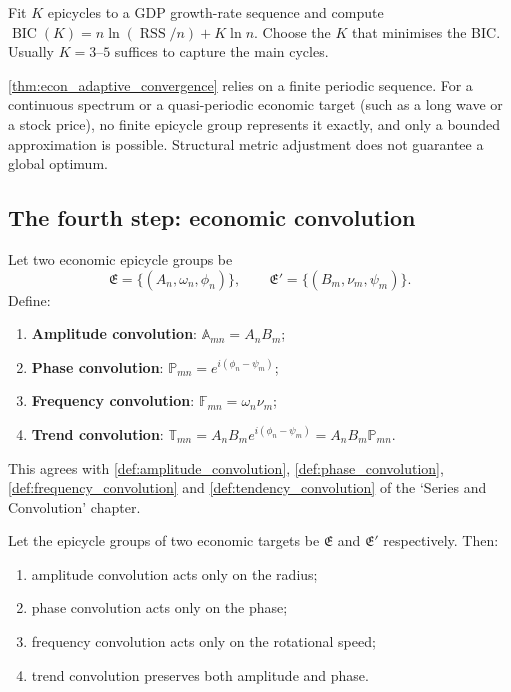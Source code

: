 \begin{example}\label{ex:econ_bic}
Fit $K$ epicycles to a GDP growth-rate sequence and compute $\operatorname{BIC}(K)=n\ln(\operatorname{RSS}/n)+K\ln n$. Choose the $K$ that minimises the BIC. Usually $K=3$--$5$ suffices to capture the main cycles.
\end{example}

\begin{remark}\label{rem:econ_adaptive_boundary}
\cref{thm:econ_adaptive_convergence} relies on a finite periodic sequence. For a continuous spectrum or a quasi-periodic economic target (such as a long wave or a stock price), no finite epicycle group represents it exactly, and only a bounded approximation is possible. Structural metric adjustment does not guarantee a global optimum.
\end{remark}

\subsection{The fourth step: economic convolution}

\begin{definition}\label{def:econ_convolution_types}
Let two economic epicycle groups be
\[
\mathfrak E=\{(A_n,\omega_n,\phi_n)\},\qquad
\mathfrak E'=\{(B_m,\nu_m,\psi_m)\}.
\]
Define:
\begin{enumerate}[label=(\roman*)]
    \item \textbf{Amplitude convolution}: $\mathbb A_{mn}=A_nB_m$;
    \item \textbf{Phase convolution}: $\mathbb P_{mn}=e^{i(\phi_n-\psi_m)}$;
    \item \textbf{Frequency convolution}: $\mathbb F_{mn}=\omega_n\nu_m$;
    \item \textbf{Trend convolution}: $\mathbb T_{mn}=A_nB_m e^{i(\phi_n-\psi_m)}=A_nB_m\mathbb P_{mn}$.
\end{enumerate}
This agrees with \cref{def:amplitude_convolution}, \cref{def:phase_convolution}, \cref{def:frequency_convolution} and \cref{def:tendency_convolution} of the `Series and Convolution' chapter.
\end{definition}

\begin{theorem}\label{thm:econ_convolution_action}
Let the epicycle groups of two economic targets be $\mathfrak E$ and $\mathfrak E'$ respectively. Then:
\begin{enumerate}[label=(\roman*)]
    \item amplitude convolution acts only on the radius;
    \item phase convolution acts only on the phase;
    \item frequency convolution acts only on the rotational speed;
    \item trend convolution preserves both amplitude and phase.
\end{enumerate}
\end{theorem}


